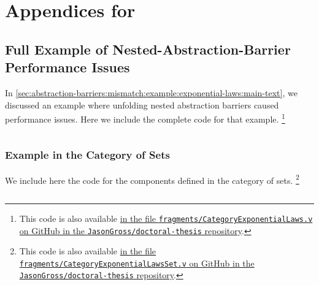 \chapter{Appendices for }\label{ch:appendix:perf-failures}
\section{Full Example of Nested-Abstraction-Barrier Performance Issues}\label{sec:abstraction-barriers:mismatch:example:exponential-laws:full-code}

In \autoref{sec:abstraction-barriers:mismatch:example:exponential-laws:main-text}, we discussed an example where unfolding nested abstraction barriers caused performance issues.
Here we include the complete code for that example.%
\footnote{%
  This code is also available \href{https://github.com/JasonGross/doctoral-thesis/blob/master/fragments/CategoryExponentialLaws.v}{in the file \texttt{fragments/CategoryExponentialLaws.v} on GitHub in the \texttt{JasonGross/doctoral-thesis} repository}.
  }


\inputminted{coq}{fragments/CategoryExponentialLaws.v}


\subsection{Example in the Category of Sets}\label{sec:abstraction-barriers:mismatch:example:exponential-laws:full-code:sets}

We include here the code for the components defined in the category of sets.%
\footnote{%
  This code is also available \href{https://github.com/JasonGross/doctoral-thesis/blob/master/fragments/CategoryExponentialLawsSet.v}{in the file \texttt{fragments/CategoryExponentialLawsSet.v} on GitHub in the \texttt{JasonGross/doctoral-thesis} repository}.
  }

\inputminted{coq}{fragments/CategoryExponentialLawsSet.v}
